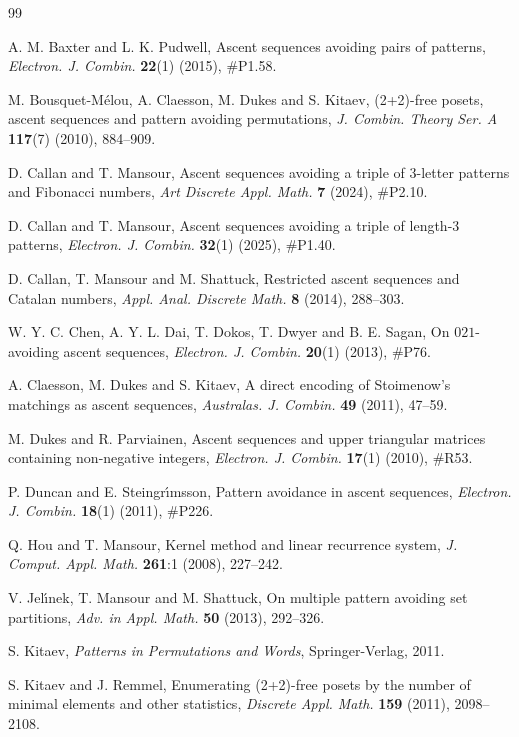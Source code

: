 \documentclass{article}
\theoremstyle{remark}
\theoremstyle{plain}
\begin{document}
\begin{thebibliography}{99}

A. M. Baxter and L. K. Pudwell, Ascent sequences avoiding pairs of patterns, \emph{Electron. J. Combin.}
{\bf22}(1) (2015), \#P1.58.

M. Bousquet-M{\'e}lou, A. Claesson, M. Dukes and S. Kitaev, (2+2)-free posets, ascent sequences and pattern avoiding permutations, \emph{J. Combin. Theory Ser. A} {\bf117}(7) (2010), 884--909.

D. Callan and T. Mansour, Ascent sequences avoiding a triple of 3-letter patterns and Fibonacci numbers, \emph{Art Discrete Appl. Math.} {\bf7} (2024), \#P2.10.

D. Callan and T. Mansour, Ascent sequences avoiding a triple of length-3 patterns, \emph{Electron. J. Combin.} {\bf32}(1) (2025), \#P1.40.

D. Callan, T. Mansour and M. Shattuck, Restricted ascent sequences and Catalan numbers, \emph{Appl. Anal. Discrete Math.} {\bf 8} (2014), 288--303.

W. Y. C. Chen, A. Y. L. Dai, T. Dokos, T. Dwyer and B. E. Sagan, On $021$-avoiding ascent sequences, \emph{Electron. J. Combin.} {\bf20}(1) (2013), \#P76.

A. Claesson, M. Dukes and S. Kitaev, A direct encoding of Stoimenow's matchings
as ascent sequences, \emph{Australas. J. Combin.} {\bf 49} (2011), 47--59.

M. Dukes and R. Parviainen, Ascent sequences and upper triangular matrices containing non-negative integers, \emph{Electron. J. Combin.} {\bf17}(1) (2010), \#R53.

P. Duncan and E. Steingr\'{\i}msson, Pattern avoidance in ascent sequences, {\em Electron. J. Combin.} {\bf18}(1) (2011), \#P226.

Q. Hou and T. Mansour, Kernel method and linear recurrence system, \emph{J. Comput. Appl. Math.} {\bf 261}:1 (2008), 227--242.

V. Jel\'\i nek, T. Mansour and M. Shattuck, On multiple pattern avoiding set partitions, \emph{Adv. in Appl. Math.} {\bf 50} (2013), 292--326.

S. Kitaev, {\it Patterns in Permutations and Words}, Springer-Verlag, 2011.

S. Kitaev and J. Remmel, Enumerating (2+2)-free posets by the number of minimal elements and other statistics, \emph{Discrete Appl. Math.} {\bf159} (2011), 2098--2108.


\end{thebibliography}
\end{document}
